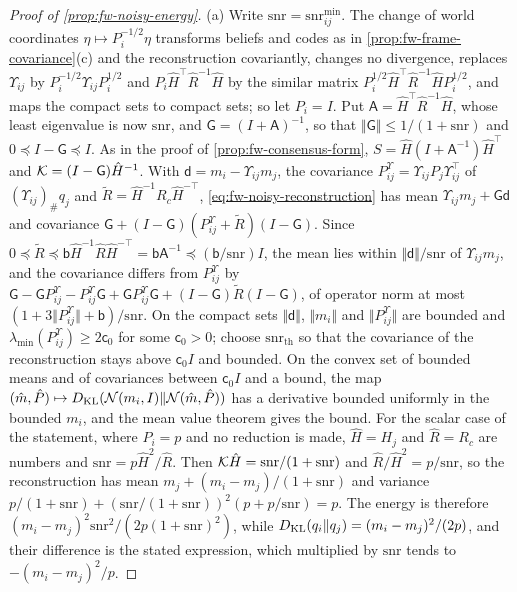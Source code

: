 \begin{proof}[Proof of \cref{prop:fw-noisy-energy}]
(a) Write $\mathrm{snr}=\mathrm{snr}^{\min}_{ij}$. The change of world coordinates $\eta\mapsto P_i^{-1/2}\eta$ transforms beliefs and codes as in \cref{prop:fw-frame-covariance}(c) and the reconstruction covariantly, changes no divergence, replaces $\Upsilon_{ij}$ by $P_i^{-1/2}\Upsilon_{ij}P_i^{1/2}$ and $P_i\hat H^\top\hat R^{-1}\hat H$ by the similar matrix $P_i^{1/2}\hat H^\top\hat R^{-1}\hat HP_i^{1/2}$, and maps the compact sets to compact sets; so let $P_i=I$. Put $\mathsf A=\hat H^\top\hat R^{-1}\hat H$, whose least eigenvalue is now $\mathrm{snr}$, and $\mathsf G=(I+\mathsf A)^{-1}$, so that $\Vert\mathsf G\Vert\le1/(1+\mathrm{snr})$ and $0\preceq I-\mathsf G\preceq I$. As in the proof of \cref{prop:fw-consensus-form}, $S=\hat H(I+\mathsf A^{-1})\hat H^\top$ and $\mathcal{K}=(I-\mathsf G)\hat H^{-1}$. With $\mathsf d=m_i-\Upsilon_{ij}m_j$, the covariance $P^\Upsilon_{ij}=\Upsilon_{ij}P_j\Upsilon_{ij}^\top$ of $(\Upsilon_{ij})_\#q_j$ and $\tilde R=\hat H^{-1}R_c\hat H^{-\top}$, \eqref{eq:fw-noisy-reconstruction} has mean $\Upsilon_{ij}m_j+\mathsf G\mathsf d$ and covariance $\mathsf G+(I-\mathsf G)(P^\Upsilon_{ij}+\tilde R)(I-\mathsf G)$. Since $0\preceq\tilde R\preceq\mathsf b\hat H^{-1}\hat R\hat H^{-\top}=\mathsf b\mathsf A^{-1}\preceq(\mathsf b/\mathrm{snr})I$, the mean lies within $\Vert\mathsf d\Vert/\mathrm{snr}$ of $\Upsilon_{ij}m_j$, and the covariance differs from $P^\Upsilon_{ij}$ by $\mathsf G-\mathsf GP^\Upsilon_{ij}-P^\Upsilon_{ij}\mathsf G+\mathsf GP^\Upsilon_{ij}\mathsf G+(I-\mathsf G)\tilde R(I-\mathsf G)$, of operator norm at most $(1+3\Vert P^\Upsilon_{ij}\Vert+\mathsf b)/\mathrm{snr}$. On the compact sets $\Vert\mathsf d\Vert$, $\Vert m_i\Vert$ and $\Vert P^\Upsilon_{ij}\Vert$ are bounded and $\lambda_{\min}(P^\Upsilon_{ij})\ge2\mathsf c_0$ for some $\mathsf c_0>0$; choose $\mathrm{snr}_{\mathrm{th}}$ so that the covariance of the reconstruction stays above $\mathsf c_0I$ and bounded. On the convex set of bounded means and of covariances between $\mathsf c_0I$ and a bound, the map $(\hat m,\hat P)\mapsto D_{\mathrm{KL}}(\mathcal{N}(m_i,I)\Vert\mathcal{N}(\hat m,\hat P))$ has a derivative bounded uniformly in the bounded $m_i$, and the mean value theorem gives the bound. For the scalar case of the statement, where $P_i=p$ and no reduction is made, $\hat H=H_j$ and $\hat R=R_c$ are numbers and $\mathrm{snr}=p\hat H^2/\hat R$. Then $\mathcal{K}\hat H=\mathrm{snr}/(1+\mathrm{snr})$ and $\hat R/\hat H^2=p/\mathrm{snr}$, so the reconstruction has mean $m_j+(m_i-m_j)/(1+\mathrm{snr})$ and variance $p/(1+\mathrm{snr})+(\mathrm{snr}/(1+\mathrm{snr}))^2(p+p/\mathrm{snr})=p$. The energy is therefore $(m_i-m_j)^2\mathrm{snr}^2/(2p(1+\mathrm{snr})^2)$, while $D_{\mathrm{KL}}(q_i\Vert q_j)=(m_i-m_j)^2/(2p)$, and their difference is the stated expression, which multiplied by $\mathrm{snr}$ tends to $-(m_i-m_j)^2/p$.


\end{proof}
